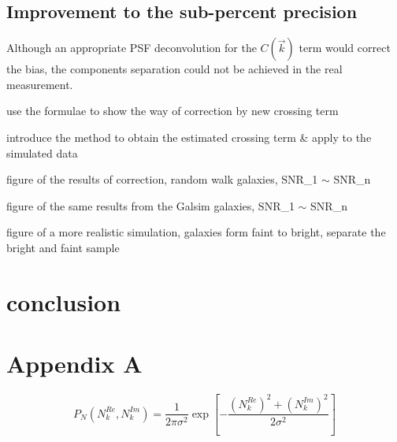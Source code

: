 \documentclass[twocolumn]{aastex62}
\begin{document}
\subsection{Improvement to the sub-percent precision}\label{sec:improve}
Although an appropriate PSF deconvolution for the $C(\vec{k})$ term would correct the bias, the components separation could not be achieved in the real measurement. 

use the formulae to show the way of correction by new crossing term

introduce the method to obtain the estimated crossing term \& apply to the simulated data

figure of the results of correction, random walk galaxies, SNR\_1 $\sim$ SNR\_n

figure of the same results from the Galsim galaxies, SNR\_1 $\sim$ SNR\_n

figure of a more realistic simulation, galaxies form faint to bright, separate the bright and faint sample

\section{conclusion}
\appendix
\section{Appendix A}\label{app_a}
\begin{equation}
P_N(N_k^{Re},N_k^{Im})=\frac{1}{2\pi\sigma^2}\exp\left[-\frac{\left(N_k^{Re}\right)^2+\left(N_k^{Im}\right)^2}{2\sigma^2}\right]
\end{equation}
\end{document}
